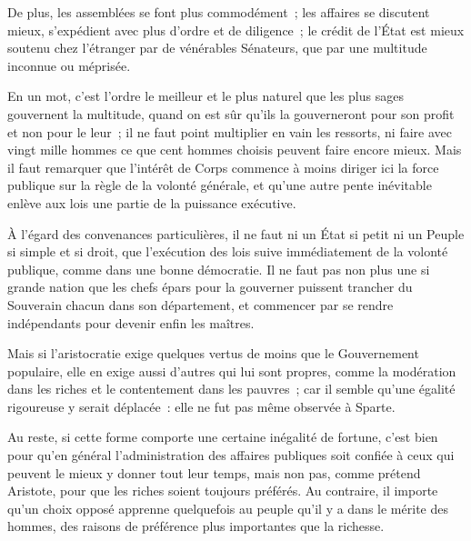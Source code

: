 \documentclass[french,twoside]{book} %
\begin{document}
De plus, les assemblées se font plus commodément ; les affaires se discutent mieux, s’expédient avec plus d’ordre et de diligence ; le crédit de l’État est mieux soutenu chez l’étranger par de vénérables Sénateurs, que par une multitude inconnue ou méprisée.\par
En un mot, c’est l’ordre le meilleur et le plus naturel que les plus sages gouvernent la multitude, quand on est sûr qu’ils la gouverneront pour son profit et non pour le leur ; il ne faut point multiplier en vain les ressorts, ni faire avec vingt mille hommes ce que cent hommes choisis peuvent faire encore mieux. Mais il faut remarquer que l’intérêt de Corps commence à moins diriger ici la force publique sur la règle de la volonté générale, et qu’une autre pente inévitable enlève aux lois une partie de la puissance exécutive.\par
À l’égard des convenances particulières, il ne faut ni un État si petit ni un Peuple si simple et si droit, que l’exécution des lois suive immédiatement de la volonté publique, comme dans une bonne démocratie. Il ne faut pas non plus une si grande nation que les chefs épars pour la gouverner puissent trancher du Souverain chacun dans son département, et commencer par se rendre indépendants pour devenir enfin les maîtres.\par
Mais si l’aristocratie exige quelques vertus de moins que le Gouvernement populaire, elle en exige aussi d’autres qui lui sont propres, comme la modération dans les riches et le contentement dans les pauvres ; car il semble qu’une égalité rigoureuse y serait déplacée : elle ne fut pas même observée à Sparte.\par
Au reste, si cette forme comporte une certaine inégalité de fortune, c’est bien pour qu’en général l’administration des affaires publiques soit confiée à ceux qui peuvent le mieux y donner tout leur temps, mais non pas, comme prétend Aristote, pour que les riches soient toujours préférés. Au contraire, il importe qu’un choix opposé apprenne quelquefois au peuple qu’il y a dans le mérite des hommes, des raisons de préférence plus importantes que la richesse.
\end{document}
